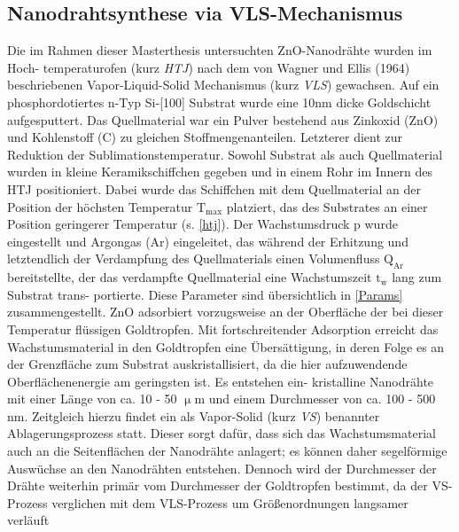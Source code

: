 \subsection{Nanodrahtsynthese via VLS-Mechanismus} Die im Rahmen dieser
Masterthesis untersuchten ZnO-Nanodrähte wurden im Hoch- temperaturofen (kurz
\textit{HTJ}) nach dem von Wagner und Ellis (1964) beschriebenen
Vapor-Liquid-Solid Mechanismus (kurz \textit{VLS}) \cite{Wagner.1964} gewachsen.
Auf ein phosphordotiertes n-Typ Si-[100] Substrat wurde eine 10nm dicke
Goldschicht aufgesputtert. Das Quellmaterial war ein Pulver bestehend aus
Zinkoxid (ZnO) und Kohlenstoff (C) zu gleichen Stoffmengenanteilen. Letzterer
dient zur Reduktion der Sublimationstemperatur. Sowohl Substrat als auch
Quellmaterial wurden in kleine Keramikschiffchen gegeben und in einem Rohr im
Innern des HTJ positioniert. Dabei wurde das Schiffchen mit dem Quellmaterial an
der Position der höchsten Temperatur $\text{T}_\text{max}$ platziert, das des
Substrates an einer Position geringerer Temperatur (s. \autoref{htj}). Der
Wachstumsdruck p wurde eingestellt und Argongas (Ar) eingeleitet, das während
der Erhitzung und letztendlich der Verdampfung des Quellmaterials einen
Volumenfluss $\text{Q}_\text{Ar}$ bereitstellte, der das verdampfte
Quellmaterial eine Wachstumszeit $\text{t}_\text{w}$ lang zum Substrat trans-
portierte. Diese Parameter sind übersichtlich in \autoref{Params}
zusammengestellt. ZnO adsorbiert vorzugsweise an der Oberfläche der bei dieser
Temperatur flüssigen Goldtropfen. Mit fortschreitender Adsorption erreicht das
Wachstumsmaterial in den Goldtropfen eine Übersättigung, in deren Folge es an
der Grenzfläche zum Substrat auskristallisiert, da die hier aufzuwendende
Oberflächenenergie am geringsten ist. Es entstehen ein- kristalline Nanodrähte
mit einer Länge von ca. 10 - 50 $\upmu$m und einem Durchmesser von ca. 100 - 500
nm. Zeitgleich hierzu findet ein als Vapor-Solid (kurz \textit{VS}) benannter
Ablagerungsprozess statt. Dieser sorgt dafür, dass sich das Wachstumsmaterial
auch an die Seitenflächen der Nanodrähte anlagert; es können daher segelförmige
Auswüchse an den Nanodrähten entstehen. Dennoch wird der Durchmesser der Drähte
weiterhin primär vom Durchmesser der Goldtropfen bestimmt, da der VS-Prozess
verglichen mit dem VLS-Prozess um Größenordnungen langsamer verläuft
